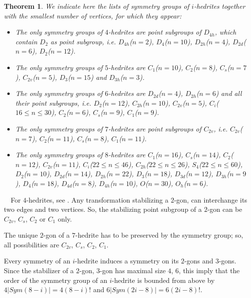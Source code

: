 \documentclass[12pt]{article}
\newtheorem{theorem}{Theorem}
\newcommand{\proof}{\noindent{\bf Proof.}\ \ }
\begin{document}
\begin{theorem}
We indicate here the lists of symmetry groups of $i$-hedrites
together with the smallest number of vertices, for which they
appear:
\begin{itemize}
\item[(i)] The only symmetry groups of $4$-hedrites are point subgroups of $D_{4h}$, which contain $D_{2}$ as point subgroup, i.e. $D_{4h}$($n=2$), $D_4$($n=10$), $D_{2h}$($n=4$), $D_{2d}$($n=6$), $D_2$($n=12$).

\item[(ii)] The only symmetry groups of $5$-hedrites are $C_1$($n=10$), $C_2$($n=8$), $C_s$($n=7$), $C_{2v}$($n=5$), $D_3$($n=15$) and $D_{3h}$($n=3$).

\item[(iii)] The only symmetry groups of $6$-hedrites are $D_{2d}$($n=4$), $D_{2h}$($n=6$) and all their point subgroups, i.e. $D_{2}$($n=12$), $C_{2h}$($n=10$), $C_{2v}$($n=5$), $C_i$($16\le n\le 30$), $C_{2}$($n=6$), $C_{s}$($n=9$), $C_{1}$($n=9$).

\item[(iv)] The only symmetry groups of $7$-hedrites are point subgroups of $C_{2v}$, i.e. $C_{2v}$($n=7$), $C_{2}$($n=11$), $C_{s}$($n=8$), $C_{1}$($n=11$).

\item[(v)] The only symmetry groups of $8$-hedrites are $C_{1}$($n=16$), $C_s$($n=14$), $C_2$($n=12$), $C_{2v}$($n=11$), $C_i$($22\leq n\leq 46$), $C_{2h}$($22\leq n \leq 26$), $S_4$($22\leq n\leq 60$), $D_2$($n=10$), $D_{2d}$($n=14$), $D_{2h}$($n=22$), $D_3$($n=18$), $D_{3d}$($n=12$), $D_{3h}$($n=9$), $D_4$($n=18$), $D_{4d}$($n=8$), $D_{4h}$($n=10$), $O$($n=30$), $O_h$($n=6$).

\end{itemize}


\end{theorem}
\proof For $4$-hedrites, see \cite{DSt}. Any transformation
stabilizing a $2$-gon, can interchange its two edges and two vertices. So, the stabilizing point subgroup of a $2$-gon can be $C_{2v}$, $C_s$, $C_2$ or $C_1$ only.

The unique $2$-gon of a $7$-hedrite has to be preserved by the symmetry
group; so, all possibilities are $C_{2v}$, $C_s$, $C_2$, $C_1$.

Every symmetry of an $i$-hedrite induces a symmetry on its $2$-gons and $3$-gons. Since the stabilizer of a $2$-gon, $3$-gon has maximal size $4$, $6$, this imply that the order of the symmetry group of an $i$-hedrite is bounded from above by $4|Sym(8-i)|=4(8-i)!$ and $6|Sym(2i-8)|=6(2i-8)!$.
\end{document}
